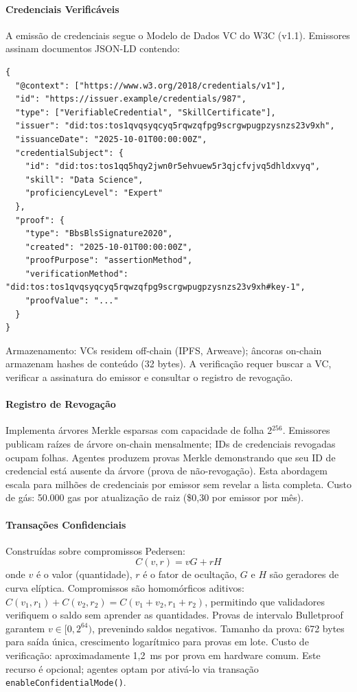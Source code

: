 \documentclass[11pt]{article}
\begin{document}
\paragraph{Credenciais Verificáveis} A emissão de credenciais segue o Modelo de Dados VC do W3C (v1.1). Emissores assinam documentos JSON-LD contendo:
\begin{verbatim}
{
  "@context": ["https://www.w3.org/2018/credentials/v1"],
  "id": "https://issuer.example/credentials/987",
  "type": ["VerifiableCredential", "SkillCertificate"],
  "issuer": "did:tos:tos1qvqsyqcyq5rqwzqfpg9scrgwpugpzysnzs23v9xh",
  "issuanceDate": "2025-10-01T00:00:00Z",
  "credentialSubject": {
    "id": "did:tos:tos1qq5hqy2jwn0r5ehvuew5r3qjcfvjvq5dhldxvyq",
    "skill": "Data Science",
    "proficiencyLevel": "Expert"
  },
  "proof": {
    "type": "BbsBlsSignature2020",
    "created": "2025-10-01T00:00:00Z",
    "proofPurpose": "assertionMethod",
    "verificationMethod": "did:tos:tos1qvqsyqcyq5rqwzqfpg9scrgwpugpzysnzs23v9xh#key-1",
    "proofValue": "..."
  }
}
\end{verbatim}
Armazenamento: VCs residem off-chain (IPFS, Arweave); âncoras on-chain armazenam hashes de conteúdo (32 bytes). A verificação requer buscar a VC, verificar a assinatura do emissor e consultar o registro de revogação.

\paragraph{Registro de Revogação} Implementa árvores Merkle esparsas com capacidade de folha 2$^{256}$. Emissores publicam raízes de árvore on-chain mensalmente; IDs de credenciais revogadas ocupam folhas. Agentes produzem provas Merkle demonstrando que seu ID de credencial está ausente da árvore (prova de não-revogação). Esta abordagem escala para milhões de credenciais por emissor sem revelar a lista completa. Custo de gás: 50.000 gas por atualização de raiz (\$0,30 por emissor por mês).

\paragraph{Transações Confidenciais} Construídas sobre compromissos Pedersen:
\begin{equation}
C(v, r) = vG + rH
\end{equation}
onde $v$ é o valor (quantidade), $r$ é o fator de ocultação, $G$ e $H$ são geradores de curva elíptica. Compromissos são homomórficos aditivos: $C(v_1, r_1) + C(v_2, r_2) = C(v_1 + v_2, r_1 + r_2)$, permitindo que validadores verifiquem o saldo sem aprender as quantidades. Provas de intervalo Bulletproof garantem $v \in [0, 2^{64})$, prevenindo saldos negativos. Tamanho da prova: 672 bytes para saída única, crescimento logarítmico para provas em lote. Custo de verificação: aproximadamente 1,2~ms por prova em hardware comum. Este recurso é opcional; agentes optam por ativá-lo via transação \texttt{enableConfidentialMode()}.
\end{document}
